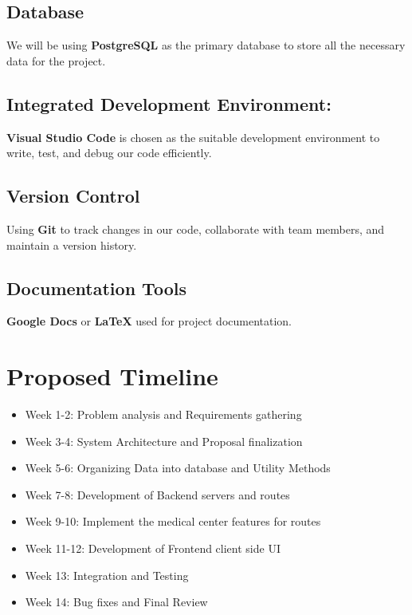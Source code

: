 \documentclass[11.5pt]{article}
\begin{document}
	\subsection{Database}
	We will be using \textbf{PostgreSQL} as the primary database to store all the necessary data for the project.
	
	\subsection{Integrated Development Environment:}
	\textbf{Visual Studio Code} is chosen as the suitable development environment to write, test, and debug our code efficiently.
	
	\subsection{Version Control}
	Using \textbf{Git} to track changes in our code, collaborate with team members, and maintain a version history.

	
	\subsection{Documentation Tools}
	\textbf{Google Docs} or \textbf {LaTeX}  used for project documentation.
	
	
	
	
	\section{Proposed Timeline}
	\begin{itemize}
		\item Week 1-2: Problem analysis and Requirements gathering
		\item Week 3-4: System Architecture and Proposal finalization
		\item Week 5-6: Organizing Data into database and Utility Methods
		\item Week 7-8: Development of Backend servers and routes
		\item Week 9-10: Implement the medical center features for routes
		\item Week 11-12: Development of Frontend client side UI
		\item Week 13: Integration and Testing
		\item Week 14: Bug fixes and Final Review
	\end{itemize}
	
	
	
\end{document}
